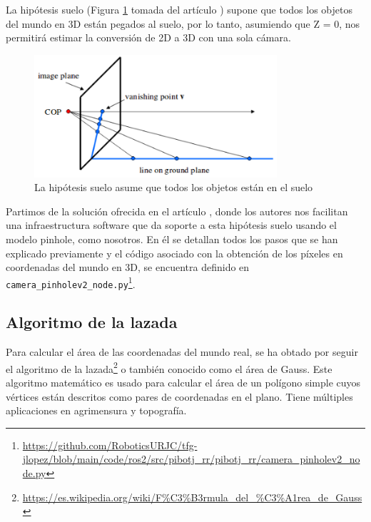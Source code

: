 
La hipótesis suelo (Figura \ref{fig:hipotesissuelo} tomada del artículo \cite{vega19d}) supone que todos los objetos del mundo en 3D están pegados al suelo, por lo tanto, asumiendo que Z = 0, nos permitirá estimar la conversión de 2D a 3D con una sola cámara.  

 \begin{figure} [h!]
	\begin{center}
		\includegraphics[width=9cm]{figs/cap6/hipotesissuelo.png}
	\end{center}
	\caption{La hipótesis suelo asume que todos los objetos están en el suelo}
	\label{fig:hipotesissuelo}
\end{figure}


Partimos de la solución ofrecida en el artículo \cite{vega19d}, donde los autores nos facilitan una infraestructura software que da soporte a esta hipótesis suelo usando el modelo pinhole, como nosotros. En él se detallan todos los pasos que se han explicado previamente y el código asociado con la obtención de los píxeles en coordenadas del mundo en 3D, se encuentra definido en \verb|camera_pinholev2_node.py|\footnote{\url{https://github.com/RoboticsURJC/tfg-jlopez/blob/main/code/ros2/src/pibotj_rr/pibotj_rr/camera_pinholev2_node.py}}.

\subsection{Algoritmo de la lazada}
\label{subsec:softwareshoelace}

Para calcular el área de las coordenadas del mundo real, se ha obtado por seguir el algoritmo de la lazada\footnote{\url{https://es.wikipedia.org/wiki/F\%C3\%B3rmula_del_\%C3\%A1rea_de_Gauss}} o también conocido como el área de Gauss. Este algoritmo matemático es usado para calcular el área de un polígono simple cuyos vértices están descritos como pares de coordenadas en el plano. Tiene múltiples aplicaciones en agrimensura y topografía.

